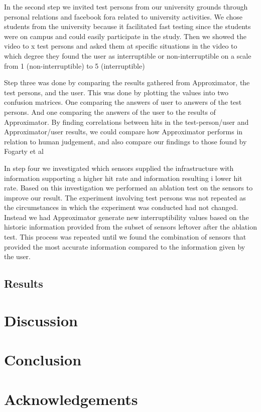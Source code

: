 \documentclass{sigchi}
\begin{document}
In the second step we invited test persons from our university grounds through personal relations and facebook fora related to university activities.
We chose students from the university because it facilitated fast testing since the students were on campus and could easily participate in the study.
Then we showed the video to x test persons and asked them at specific situations in the video to which degree they found the user as interruptible or non-interruptible on a scale from 1 (non-interruptible) to 5 (interruptible)

Step three was done by comparing the results gathered from Approximator, the test persons, and the user.
This was done by plotting the values into two confusion matrices.
One comparing the answers of user to answers of the test persons.
And one comparing the answers of the user to the results of Approximator.
By finding correlations between hits in the test-person/user and Approximator/user results, we could compare how Approximator performs in relation to human judgement, and also compare our findings to those found by Fogarty et al \cite{fogarty2005predicting}

In step four we investigated which sensors supplied the infrastructure with information supporting a higher hit rate and information resulting i lower hit rate.
Based on this investigation we performed an ablation test on the sensors to improve our result.
The experiment involving test persons was not repeated as the circumstances in which the experiment was conducted had not changed.
Instead we had Approximator generate new interruptibility values based on the historic information provided from the subset of sensors leftover after the ablation test.
This process was repeated until we found the combination of sensors that provided the most accurate information compared to the information given by the user.

\subsection{Results}

\section{Discussion}

\section{Conclusion}

\section{Acknowledgements}

\balance



\end{document}
